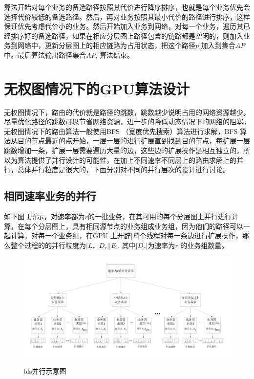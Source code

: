 算法开始对每个业务的备选路径按照其代价进行降序排序，也就是每个业务优先会选择代价较低的备选路径。然后，再对业务按照其最小代价的路径进行排序，这样保证优先考虑代价小的业务。然后开始加入业务到网络，对每一个业务，遍历其已经排序好的备选路径，如果在相应分层图上路径包含的链路都是空闲的，则加入业务到网络中，更新分层图上的相应链路为占用状态，把这个路径$p$ 加入到集合$AP$ 中。最后算法输出路径集合$AP$, 算法结束。
\section{无权图情况下的GPU算法设计}

无权图情况下，路由的代价就是路径的跳数，跳数越少说明占用的网络资源越少，尽量优化路径的跳数可以节省网络资源，进一步的降低动态情况下的网络的阻塞。无权图情况下的路由算法一般使用BFS （宽度优先搜索）算法进行求解，BFS 算法从目的节点最近的点开始，一层一层的进行扩展直到找到目的节点，每扩展一层跳数增加一条，扩展一层需要遍历大量的边，这些边的扩展操作是相互独立的，所以为算法提供了并行设计的可能性，在加上不同速率不同层上的路由求解上的并行，总体并行粒度是很大的，下面分别对不同的并行层次的设计进行讨论。
\subsection {相同速率业务的并行}

如下图 \ref{bfs}所示，对速率都为$r$的一批业务，在其可用的每个分层图上并行进行计算，在每个分层图上，具有相同源节点的业务组成业务组，因为他们的路径可以一起计算，对每一个业务组，在GPU 上开辟$|E|$个线程对每一条边进行扩展操作，那么整个过程的的并行粒度为$|L_r||D_r||E|$, 其中$|D_r|$为速率为$r$ 的业务组数量。
\begin{figure}
\setlength{\belowcaptionskip}{-0.5cm}
\begin{center}
{\includegraphics[width=1 \textwidth]{figures/bfs.pdf}}
\end{center}
\caption{{\footnotesize{bfs并行示意图}}}
\label{bfs}
\end{figure}
